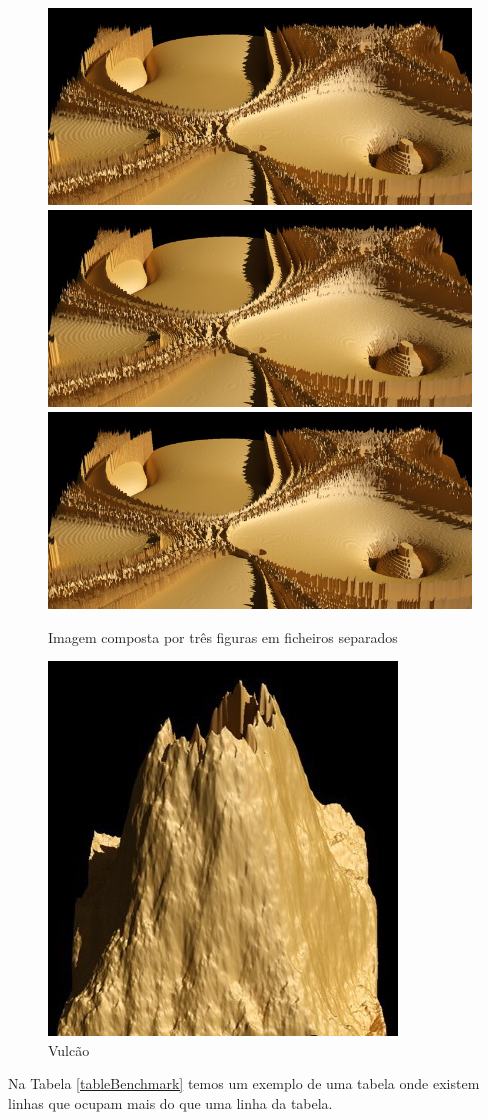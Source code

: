 \begin{figure}
 \centering
 \includegraphics[width=0.32\linewidth]{imgs/tp04a_450}
 \includegraphics[width=0.32\linewidth]{imgs/tp04a_450}
 \includegraphics[width=0.32\linewidth]{imgs/tp04a_450}
 \caption[curta]{Imagem composta por três figuras em ficheiros separados}
 \label{fig:terrenos}
\end{figure}


\begin{figure}
 \centering
 \includegraphics[width=0.5\linewidth]{imgs/tp45a_450}
 \caption{Vulcão}
 \label{fig:volcao}
\end{figure}


Na Tabela \ref{tableBenchmark} temos um exemplo de uma tabela onde existem linhas que ocupam mais do que uma linha da tabela.


